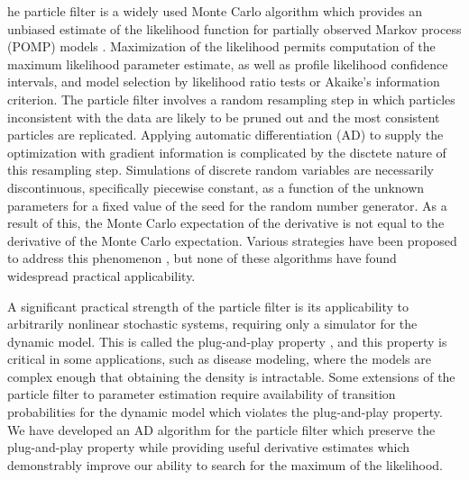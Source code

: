 \documentclass[9pt,twocolumn,twoside]{pnas-new}
\begin{document}
he particle filter is a widely used Monte Carlo algorithm which provides an unbiased estimate of the likelihood function for partially observed Markov process (POMP) models .
Maximization of the likelihood permits computation of the maximum likelihood parameter estimate, as well as profile likelihood confidence intervals, and model selection by likelihood ratio tests or Akaike's information criterion.
The particle filter involves a random resampling step in which particles inconsistent with the data are likely to be pruned out and the most consistent particles are replicated.
Applying automatic differentiation (AD) to supply the optimization with gradient information is complicated by the disctete nature of this resampling step.
Simulations of discrete random variables are necessarily discontinuous, specifically piecewise constant, as a function of the unknown parameters for a fixed value of the seed for the random number generator.
As a result of this, the Monte Carlo expectation of the derivative is not equal to the derivative of the Monte Carlo expectation.
Various strategies have been proposed to address this phenomenon , but none of these algorithms have found widespread practical applicability.

A significant practical strength of the particle filter is its applicability to arbitrarily nonlinear stochastic systems, requiring only a simulator for the dynamic model.
This is called the plug-and-play property , and this property is critical in some applications, such as disease modeling, where the models are complex enough that obtaining the density is intractable.
Some extensions of the particle filter to parameter estimation require availability of transition probabilities for the dynamic model  which violates the plug-and-play property.
We have developed an AD algorithm for the particle filter which preserve the plug-and-play property while providing useful derivative estimates which demonstrably improve our ability to search for the maximum of the likelihood.
\end{document}
